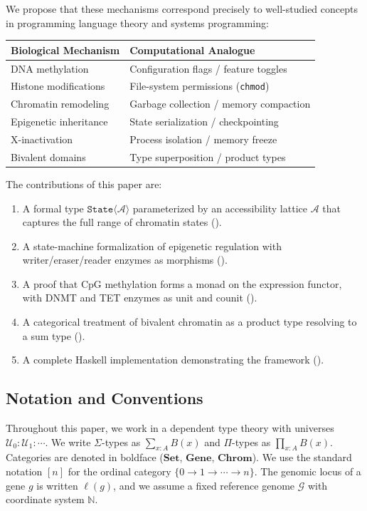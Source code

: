 \documentclass[12pt,a4paper]{article}
\newcommand{\StateT}{\texttt{State}}
\newcommand{\cat}[1]{\mathbf{#1}}
\begin{document}
We propose that these mechanisms correspond precisely to well-studied concepts in programming language theory and systems programming:

\begin{center}
\begin{tabular}{ll}
\toprule
\textbf{Biological Mechanism} & \textbf{Computational Analogue} \\
\midrule
DNA methylation & Configuration flags / feature toggles \\
Histone modifications & File-system permissions (\texttt{chmod}) \\
Chromatin remodeling & Garbage collection / memory compaction \\
Epigenetic inheritance & State serialization / checkpointing \\
X-inactivation & Process isolation / memory freeze \\
Bivalent domains & Type superposition / product types \\
\bottomrule
\end{tabular}
\end{center}

The contributions of this paper are:
\begin{enumerate}
    \item A formal type $\StateT\langle\mathcal{A}\rangle$ parameterized by an accessibility lattice $\mathcal{A}$ that captures the full range of chromatin states ().
    \item A state-machine formalization of epigenetic regulation with writer/eraser/reader enzymes as morphisms ().
    \item A proof that CpG methylation forms a monad on the expression functor, with DNMT and TET enzymes as unit and counit ().
    \item A categorical treatment of bivalent chromatin as a product type resolving to a sum type ().
    \item A complete Haskell implementation demonstrating the framework ().
\end{enumerate}

\subsection{Notation and Conventions}

Throughout this paper, we work in a dependent type theory with universes $\mathcal{U}_0 : \mathcal{U}_1 : \cdots$. We write $\Sigma$-types as $\sum_{x:A} B(x)$ and $\Pi$-types as $\prod_{x:A} B(x)$. Categories are denoted in boldface ($\cat{Set}$, $\cat{Gene}$, $\cat{Chrom}$). We use the standard notation $[n]$ for the ordinal category $\{0 \to 1 \to \cdots \to n\}$. The genomic locus of a gene $g$ is written $\ell(g)$, and we assume a fixed reference genome $\mathcal{G}$ with coordinate system $\mathbb{N}$.
\end{document}
